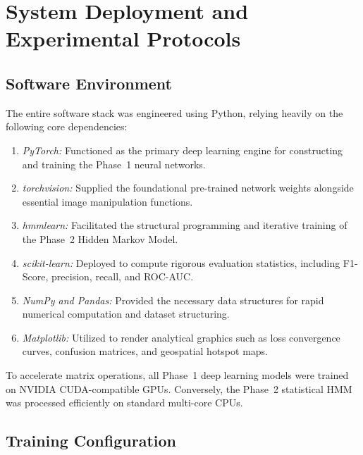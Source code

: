 \documentclass[12pt,a4paper]{report}
\begin{document}
\chapter{System Deployment and Experimental Protocols}\label{implementation}

\section{Software Environment}
The entire software stack was engineered using Python, relying heavily on the following core dependencies:

\begin{enumerate}
    \item \textit{PyTorch:} Functioned as the primary deep learning engine for constructing and training the Phase~1 neural networks.
    \item \textit{torchvision:} Supplied the foundational pre-trained network weights alongside essential image manipulation functions.
    \item \textit{hmmlearn:} Facilitated the structural programming and iterative training of the Phase~2 Hidden Markov Model.
    \item \textit{scikit-learn:} Deployed to compute rigorous evaluation statistics, including F1-Score, precision, recall, and ROC-AUC.
    \item \textit{NumPy and Pandas:} Provided the necessary data structures for rapid numerical computation and dataset structuring.
    \item \textit{Matplotlib:} Utilized to render analytical graphics such as loss convergence curves, confusion matrices, and geospatial hotspot maps.
\end{enumerate}

To accelerate matrix operations, all Phase~1 deep learning models were trained on NVIDIA CUDA-compatible GPUs. Conversely, the Phase~2 statistical HMM was processed efficiently on standard multi-core CPUs.

\section{Training Configuration}
\end{document}
